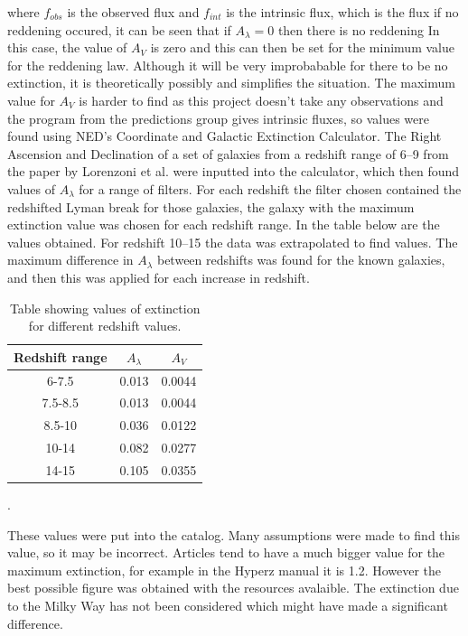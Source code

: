 			where $f_{obs}$ is the observed flux and $f_{int}$ is the intrinsic flux, which is the flux if no reddening occured\cite{hyperz}, it can be seen that if $A_\lambda=0$ then there is no reddening In this case, the value of $A_V$ is zero and this can then be set for the minimum value for the reddening law. Although it will be very improbabable for there to be no extinction, it is theoretically possibly and simplifies the situation. The maximum value for $A_V$ is harder to find as this project doesn't take any observations and the program from the predictions group gives intrinsic fluxes, so values were found using NED's Coordinate and Galactic Extinction Calculator\cite{NEDex}. The Right Ascension and Declination of a set of galaxies from a redshift range of 6--9 from the paper by Lorenzoni et al. \cite{lorenzoni2013constraining} were inputted into the calculator, which then found values of $A_\lambda$ for a range of filters. For each redshift the filter chosen contained the redshifted Lyman break for those galaxies, the galaxy with the maximum extinction value was chosen for each redshift range. In the table below are the values obtained. For redshift 10--15 the data was extrapolated to find values. The maximum difference in $A_\lambda$ between redshifts was found for the known galaxies, and then this was applied for each increase in redshift.
			\begin{table}[ht]
				\begin{center}
					\begin{tabular}{c|c|c}
						Redshift range & $A_\lambda$ & $A_V$  \\
						\hline \hline
						6-7.5	   &0.013&  0.0044 \\
						7.5-8.5&0.013&  0.0044 \\
						8.5-10 &0.036&  0.0122\\
						10-14  &0.082&  0.0277\\
						14-15  &0.105&  0.0355\\
					\end{tabular}
				\end{center}
				\caption{Table showing values of extinction for different redshift values.}
				\label{tab:extinction_values}
			\end{table}.

			These values were put into the catalog. Many assumptions were made to find this value, so it may be incorrect. Articles tend to have a much bigger value for the maximum extinction, for example in the Hyperz manual it is 1.2. However the best possible figure was obtained with the resources avalaible. The extinction due to the Milky Way has not been considered which might have made a significant difference.

